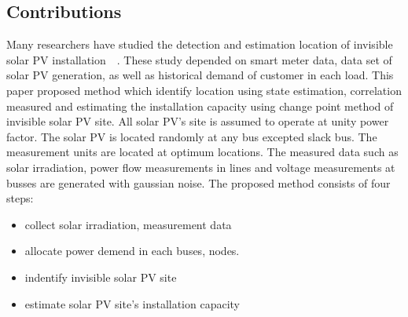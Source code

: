 \subsection{Contributions}
Many researchers have studied the detection and estimation location of invisible solar PV installation~\cite{b11}~\cite{b14}.
These study depended on smart meter data, data set of solar PV generation, as well as historical demand of customer in each load.
This paper proposed method which identify location using state estimation, correlation measured and estimating the installation capacity using change point method of invisible solar PV site.
All solar PV's site is assumed to operate at unity power factor.
The solar PV is located randomly at any bus excepted slack bus.
The measurement units are located at optimum locations.
The measured data such as solar irradiation, power flow measurements in lines and voltage measurements at busses are generated with gaussian noise.
The proposed method consists of four steps:
\begin{itemize}
  \item collect solar irradiation, measurement data
  \item allocate power demend in each buses, nodes.
  \item indentify invisible solar PV site
  \item estimate solar PV site's installation capacity
\end{itemize}
